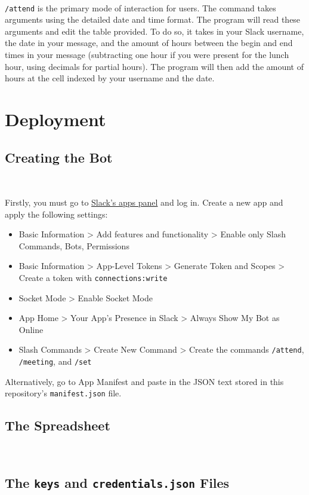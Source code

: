 \documentclass{article}
\begin{document}
\

\texttt{/attend} is the primary mode of interaction for users. The command takes arguments using the detailed date and time format. The program will read these arguments and edit the table provided. To do so, it takes in your Slack username, the date in your message, and the amount of hours between the begin and end times in your message (subtracting one hour if you were present for the lunch hour, using decimals for partial hours). The program will then add the amount of hours at the cell indexed by your username and the date.

\section{Deployment}

\subsection{Creating the Bot}

\

Firstly, you must go to \href{https://api.slack.com/apps}{Slack's apps panel} and log in. Create a new app and apply the following settings:
\begin{itemize}
	\item Basic Information > Add features and functionality > Enable only Slash Commands, Bots, Permissions
	\item Basic Information > App-Level Tokens > Generate Token and Scopes > Create a token with \texttt{connections:write}
	\item Socket Mode > Enable Socket Mode
	\item App Home > Your App’s Presence in Slack > Always Show My Bot as Online
	\item Slash Commands > Create New Command > Create the commands \texttt{/attend}, \texttt{/meeting}, and \texttt{/set}
\end{itemize}

Alternatively, go to App Manifest and paste in the JSON text stored in this repository's \texttt{manifest.json} file.

\subsection{The Spreadsheet}

\

\subsection{The \texttt{keys} and \texttt{credentials.json} Files}
\end{document}
